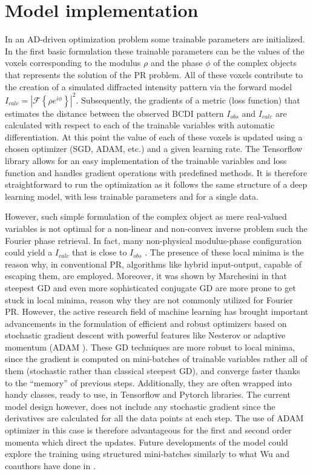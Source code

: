 \section{Model implementation}
In an AD-driven optimization problem some trainable parameters are initialized. In the first basic formulation these 
trainable parameters can be the values of the voxels corresponding to the modulus $\rho$ and the phase $\phi$ of the complex 
objects that represents the solution of the PR problem. All of these voxels contribute to the creation of a simulated 
diffracted intensity pattern via the forward model $I_{calc} = |\mathcal{F}\left\{ \rho e^{i\phi} \right\}|^2$. Subsequently, 
the gradients of a metric (loss function) that estimates the distance between the observed BCDI pattern $I_{obs}$ and $I_{calc}$ 
are calculated with respect to each of the trainable variables with automatic differentiation. At this point the value 
of each of these voxels is updated using a chosen optimizer (SGD, ADAM, etc.) and a given learning rate. The Tensorflow 
library allows for an easy implementation of the trainable variables and loss function and handles gradient operations 
with predefined methods. It is therefore straightforward to run the optimization as it follows the same structure of 
a deep learning model, with less trainable parameters and for a single data. 

However, such simple formulation of the complex object as mere real-valued variables is not optimal for a non-linear and non-convex 
inverse problem such the Fourier phase retrieval. In fact, many non-physical modulus-phase configuration could yield a 
$I_{calc}$ that is close to  $I_{obs}$ \cite{favre-nicolin_free_2020}. The presence of these local minima is the reason why, in conventional PR, algorithms 
like hybrid input-output, capable of escaping them, are employed. 
Moreover, it was shown by Marchesini in \cite{marchesini_unified_2007}
that steepest GD and even more sophisticated conjugate GD are more prone to get stuck in local 
minima, reason why they are not commonly utilized for Fourier PR. However, the active research field of machine learning has 
brought important advancements in the formulation of efficient and robust optimizers based on stochastic gradient descent with 
powerful features like Nesterov or adaptive momentum (ADAM \cite{ADAM}). These GD techniques are more robust to local minima, 
since the gradient is computed on mini-batches of trainable variables rather all of them (stochastic rather than classical steepest GD), 
and converge faster thanks to the ``memory'' of previous steps. Additionally, they are often wrapped into handy classes, ready to use, 
in Tensorflow and Pytorch libraries. The current model design however, does not include any stochastic gradient since the 
derivatives are calculated for all the data points at each step. The use of ADAM optimizer in this case is therefore 
advantageous for the first and second order momenta which direct the updates. Future developments of the model could 
explore the training using structured mini-batches similarly to what Wu and coauthors have done in \cite{tagaki_2025}. 


